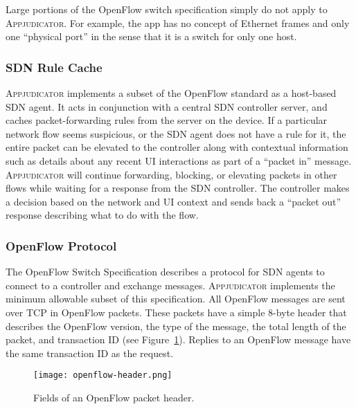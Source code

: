 Large portions of the OpenFlow switch specification simply do not apply to
\textsc{Appjudicator}. For example, the app has no concept of Ethernet frames
and only one ``physical port'' in the sense that it is a switch for only one
host.


\subsubsection{SDN Rule Cache}
\label{sec:implementation-sdn-rule-cache}

\textsc{Appjudicator} implements a subset of the OpenFlow standard as a
host-based SDN agent. It acts in conjunction with a central SDN controller
server, and caches packet-forwarding rules from the server on the device. If a
particular network flow seems suspicious, or the SDN agent does not have a rule
for it, the entire packet can be elevated to the controller along with
contextual information such as details about any recent UI interactions as part
of a ``packet in'' message. \textsc{Appjudicator} will continue forwarding,
blocking, or elevating packets in other flows while waiting for a response from
the SDN controller. The controller makes a decision based on the network and UI
context and sends back a ``packet out'' response describing what to do with the
flow.

\subsubsection{OpenFlow Protocol}
\label{sec:openflow-protocol}

The OpenFlow Switch Specification describes a protocol for SDN agents to connect
to a controller and exchange messages. \textsc{Appjudicator} implements the
minimum allowable subset of this specification. All OpenFlow messages are sent
over TCP in OpenFlow packets. These packets have a simple 8-byte header that
describes the OpenFlow version, the type of the message, the total length of the
packet, and transaction ID (see Figure~\ref{fig:openflow-header}). Replies to an
OpenFlow message have the same transaction ID as the request.

\begin{figure}[h]
    \centering
    \texttt{[image: openflow-header.png]}
    \caption{Fields of an OpenFlow packet header.}
    \label{fig:openflow-header}
\end{figure}

